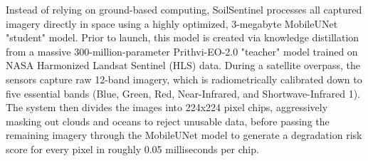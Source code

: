 \documentclass[11pt,letterpaper]{article}
\theoremstyle{plain}
\theoremstyle{definition}
\theoremstyle{remark}
\begin{document}
Instead of relying on ground-based computing, SoilSentinel processes all captured imagery directly in space using a highly optimized, 3-megabyte MobileUNet "student" model. Prior to launch, this model is created via knowledge distillation from a massive 300-million-parameter Prithvi-EO-2.0 "teacher" model trained on NASA Harmonized Landsat Sentinel (HLS) data. During a satellite overpass, the sensors capture raw 12-band imagery, which is radiometrically calibrated down to five essential bands (Blue, Green, Red, Near-Infrared, and Shortwave-Infrared 1). The system then divides the images into 224x224 pixel chips, aggressively masking out clouds and oceans to reject unusable data, before passing the remaining imagery through the MobileUNet model to generate a degradation risk score for every pixel in roughly 0.05 milliseconds per chip.
\end{document}
